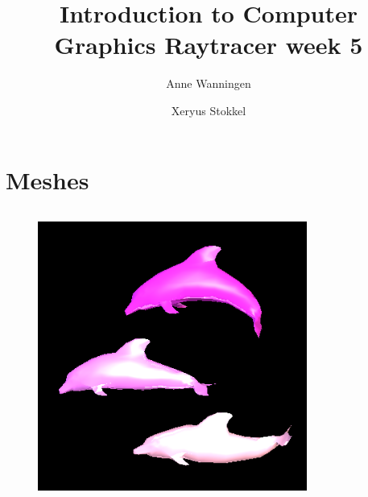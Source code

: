 \documentclass{beamer}
\author{Anne Wanningen \and Xeryus Stokkel}
\title[Week 4]{Introduction to Computer Graphics Raytracer week 5}
\begin{document}
\maketitle

\section{Meshes}
\begin{frame}
	\begin{columns}[T]
		\begin{column}{.45\textwidth}
			\begin{figure}
				\includegraphics[width=\textwidth]{dolphins2}
			\end{figure}
		\end{column}
		\begin{column}{.45\textwidth}
			\begin{figure}

\end{figure}
\end{column}
\end{columns}
\end{frame}
\end{document}
